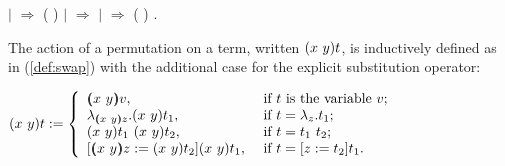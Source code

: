 \begin{coqdoccode}
\coqdocindent{1.00em}
\ensuremath{|}    \ensuremath{\Rightarrow}   ( )\coqdoceol
\coqdocindent{1.00em}
\ensuremath{|}    \ensuremath{\Rightarrow}     \coqdoceol
\coqdocindent{1.00em}
\ensuremath{|}     \ensuremath{\Rightarrow} \coqdocnotation{(}  ( )\coqdocnotation{)}   \coqdoceol
\coqdocindent{1.00em}
.\coqdoceol
\coqdocemptyline
\end{coqdoccode}
The action of a permutation on a term, written $(x\ y) t$, is inductively defined as in (\ref{def:swap}) with the additional case for the explicit substitution operator:\vspace{.5cm}


$\swap{x}{y}{t} := \left\{ \begin{array}{ll}
\vswap{x}{y}{v}, & \mbox{ if } t \mbox{ is the variable } v; \\
\lambda_{\vswap{x}{y}{z}}. \swap{x}{y}{t_1}, & \mbox{ if } t = \lambda_z.t_1; \\
\swap{x}{y}{t_1}\ \swap{x}{y}{t_2}, & \mbox{ if } t = t_1\ t_2;\\
\esub{\swap{x}{y}{t_1}}{\vswap{x}{y}{z}}{\swap{x}{y}{t_2}}, & \mbox{ if } t = \esub{t_1}{z}{t_2}.
\end{array}\right.$ \vspace{.5cm}


